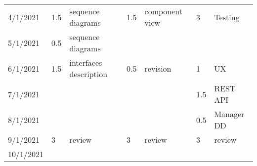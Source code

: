 \begin{table}[H]
\begin{tabular}{|l|l|p{2.5cm}|l|p{2.5cm}|l|p{2.5cm}|}
        4/1/2021   & 1.5   & sequence diagrams      & 1.5   & component view                 & 3      & Testing                 \\
        5/1/2021   & 0.5   & sequence diagrams      &       &                                &        &                         \\
        6/1/2021   & 1.5   & interfaces description & 0.5   & revision                       & 1      & UX                      \\
        7/1/2021   &       &                        &       &                                & 1.5    & REST API                \\
        8/1/2021   &       &                        &       &                                & 0.5    & Manager DD              \\
        9/1/2021   & 3     & review                 & 3     & review                         & 3      & review                  \\
        10/1/2021  &       &                        &       &                                &        &                        \\
        \hline
    \end{tabular}
    \end{table}
